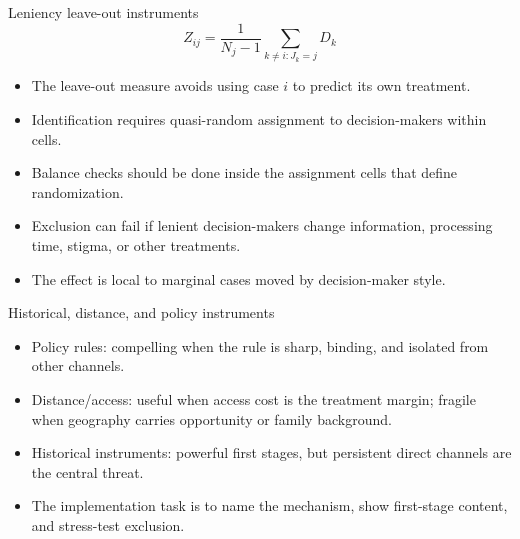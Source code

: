 \documentclass[aspectratio=169,11pt]{beamer}
\newcommand{\1}{\mathbf{1}}
\begin{document}
\begin{frame}{Leniency leave-out instruments}
\[
Z_{ij}
=
\frac{1}{N_j-1}\sum_{k\neq i:J_k=j}D_k
\]

\begin{itemize}
    \item The leave-out measure avoids using case $i$ to predict its own treatment.
    \item Identification requires quasi-random assignment to decision-makers within cells.
    \item Balance checks should be done inside the assignment cells that define randomization.
    \item Exclusion can fail if lenient decision-makers change information, processing time, stigma, or other treatments.
    \item The effect is local to marginal cases moved by decision-maker style.
\end{itemize}
\end{frame}

\begin{frame}{Historical, distance, and policy instruments}
\begin{itemize}
    \item Policy rules: compelling when the rule is sharp, binding, and isolated from other channels.
    \item Distance/access: useful when access cost is the treatment margin; fragile when geography carries opportunity or family background.
    \item Historical instruments: powerful first stages, but persistent direct channels are the central threat.
    \item The implementation task is to name the mechanism, show first-stage content, and stress-test exclusion.
\end{itemize}
\end{frame}
\end{document}
